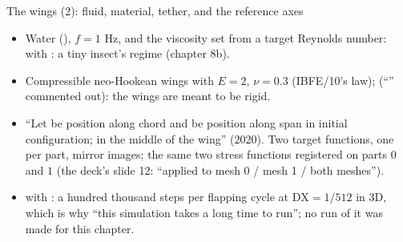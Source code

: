 \documentclass[aspectratio=169,11pt]{beamer}
\begin{document}
\begin{frame}{The wings (2): fluid, material, tether, and the reference axes}
\label{fr:wings2}
\footnotesize
\begin{itemize}
  \item Water (), $f = 1$ Hz, and the viscosity set from a target Reynolds number:  with : a tiny insect's regime (chapter 8b).
  \item Compressible neo-Hookean wings with $E = 2$, $\nu = 0.3$ (IBFE/10's law);  (``'' commented out): the wings are meant to be rigid.
  \item ``Let  be position along chord and  be position along span in initial configuration;  in the middle of the wing'' (2020). Two target functions, one per part, mirror images; the same two stress functions registered on parts $0$ and $1$ (the deck's slide 12: ``applied to mesh 0 / mesh 1 / both meshes'').
  \item {} with : a hundred thousand steps per flapping cycle at $\mathrm{DX} = 1/512$ in 3D, which is why ``this simulation takes a long time to run''; no run of it was made for this chapter.
\end{itemize}
\end{frame}
\end{document}
